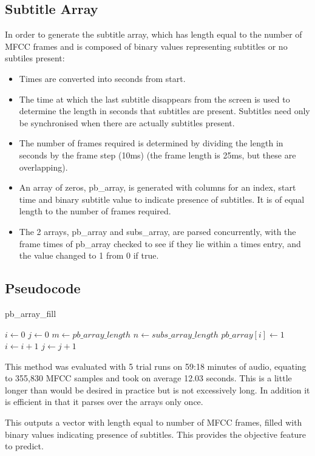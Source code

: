 \subsection{Subtitle Array}
In order to generate the subtitle array, which has length equal to the number of MFCC frames and is composed of binary values representing subtitles or no subtiles present:
\begin{itemize}
	\item Times are converted into seconds from start.
	\item The time at which the last subtitle disappears from the screen is used to determine the length in seconds that subtitles are present. Subtitles need only be synchronised when there are actually subtitles present.
	\item The number of frames required is determined by dividing the length in seconds by the frame step (10ms) (the frame length is 25ms, but these are overlapping).
	\item An array of zeros, pb\_array, is generated with columns for an index, start time and binary subtitle value to indicate presence of subtitles. It is of equal length to the number of frames required.
	\item The 2 arrays, pb\_array and subs\_array, are parsed concurrently, with the frame times of pb\_array checked to see if they lie within a times entry, and the value changed to 1 from 0 if true.
\end{itemize}

\subsection{Pseudocode}
\begin{algorithm}
	\caption{pb\_array\_fill}\label{euclid}
	\begin{algorithmic}[1]
		\Procedure{}{}
		\State $i \gets 0$
		\State $j \gets 0$
		\State $m \gets pb\_array\_length$
		\State $n \gets subs\_array\_length$
			\BREAK
			\EndIf
			\BREAK
			\EndIf
				\State $pb\_array[i] \gets 1$
				\State $i \gets i+1$
				\EndIf
			\Else
				\State $j \gets j+1$
			\EndIf
		\EndIf
		\EndProcedure
	\end{algorithmic}
\end{algorithm}

This method was evaluated with 5 trial runs on 59:18 minutes of audio, equating to 355,830 MFCC samples and took on average 12.03 seconds. This is a little longer than would be desired in practice but is not excessively long. In addition it is efficient in that it parses over the arrays only once.

This outputs a vector with length equal to number of MFCC frames, filled with binary values indicating presence of subtitles. This provides the objective feature to predict.